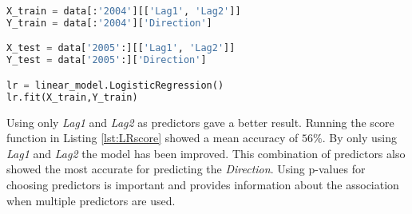\begin{lstlisting}[language=Python, label=lst:OnlyLag1Lag2, caption=Logistic regression using only Lag1 and Lag2 as predictors]
X_train = data[:'2004'][['Lag1', 'Lag2']]
Y_train = data[:'2004']['Direction']

X_test = data['2005':][['Lag1', 'Lag2']]
Y_test = data['2005':]['Direction']

lr = linear_model.LogisticRegression()
lr.fit(X_train,Y_train)
\end{lstlisting}

Using only \emph{Lag1} and \emph{Lag2} as predictors gave a better result. Running the score function in Listing \ref{lst:LRscore} showed a mean accuracy of $56\%$. By only using \emph{Lag1} and \emph{Lag2} the model has been improved. This combination of predictors also showed the most accurate for predicting the \emph{Direction}. Using p-values for choosing predictors is important and provides information about the association when multiple predictors  are used.






